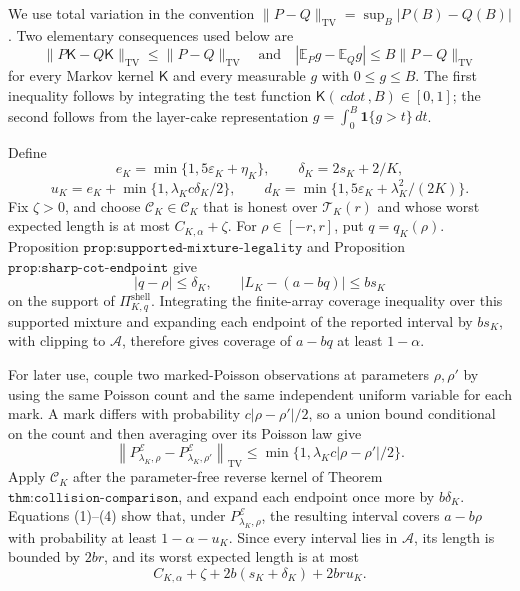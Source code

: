 We use total variation in the convention
\(\lVert P-Q\rVert_{\mathrm{TV}}=\sup_B|P(B)-Q(B)|\).
Two elementary consequences used below are
\[
 \lVert P\mathsf K-Q\mathsf K\rVert_{\mathrm{TV}}
 \le \lVert P-Q\rVert_{\mathrm{TV}}
 \quad\text{and}\quad
 |\mathbb E_Pg-\mathbb E_Qg|
 \le B\lVert P-Q\rVert_{\mathrm{TV}}
 \tag{1}
\]
for every Markov kernel \(\mathsf K\) and every measurable
\(g\) with \(0\le g\le B\).  The first inequality follows by
integrating the test function \(\mathsf K(\,cdot\,,B)\in[0,1]\);
the second follows from the layer-cake representation
\(g=\int_0^B\mathbf 1\{g>t\}\,dt\).

Define
\[
 e_K=\min\{1,5\varepsilon_K+\eta_K\},\qquad
 \delta_K=2s_K+2/K,
\]
\[
 u_K=e_K+\min\{1,\lambda_Kc\delta_K/2\},
 \qquad
 d_K=\min\{1,5\varepsilon_K+\lambda_K^2/(2K)\}.
 \tag{2}
\]
Fix \(\zeta>0\), and choose
\(\mathcal C_K\in\mathscr C_K\) that is honest over
\(\mathcal T_K(r)\) and whose worst expected length is at most
\(C_{K,\alpha}+\zeta\).  For \(\rho\in[-r,r]\), put
\(q=q_K(\rho)\).  Proposition
\(\texttt{prop:supported-mixture-legality}\) and Proposition
\(\texttt{prop:sharp-cot-endpoint}\) give
\[
 |q-\rho|\le\delta_K,
 \qquad
 |L_K-(a-bq)|\le bs_K
 \tag{3}
\]
on the support of \(\Pi_{K,q}^{\mathrm{shell}}\).  Integrating the
finite-array coverage inequality over this supported mixture and
expanding each endpoint of the reported interval by \(bs_K\), with
clipping to \(\mathcal A\), therefore gives coverage of \(a-bq\) at
least \(1-\alpha\).

For later use, couple two marked-Poisson observations at parameters
\(\rho,\rho'\) by using the same Poisson count and the same independent
uniform variable for each mark.  A mark differs with probability
\(c|\rho-\rho'|/2\), so a union bound conditional on the count and then
averaging over its Poisson law give
\[
 \left\lVert P^{\mathcal E}_{\lambda_K,\rho}
 -P^{\mathcal E}_{\lambda_K,\rho'}\right\rVert_{\mathrm{TV}}
 \le\min\{1,\lambda_Kc|\rho-\rho'|/2\}.
 \tag{4}
\]
Apply \(\mathcal C_K\) after the parameter-free reverse kernel of
Theorem \(\texttt{thm:collision-comparison}\), and expand each endpoint
once more by \(b\delta_K\).  Equations (1)--(4) show that, under
\(P^{\mathcal E}_{\lambda_K,\rho}\), the resulting interval covers
\(a-b\rho\) with probability at least \(1-\alpha-u_K\).  Since every
interval lies in \(\mathcal A\), its length is bounded by \(2br\), and
its worst expected length is at most
\[
 C_{K,\alpha}+\zeta+2b(s_K+\delta_K)+2bru_K.
 \tag{5}
\]

